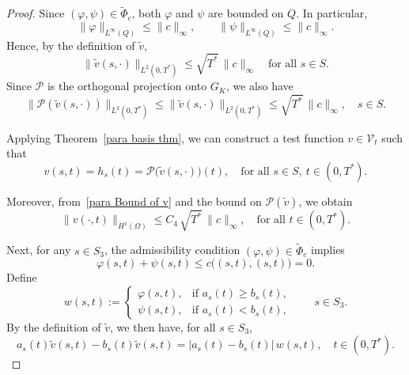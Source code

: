 \documentclass[12pt]{amsart}
\begin{document}
\begin{proof}

    Since \( (\varphi, \psi) \in \widetilde{\Phi}_c \), both \(\varphi\) and \(\psi\) are bounded on \(Q\). In particular,
    \begin{equation*}
        \|\varphi\|_{L^{\infty}(Q)} \leq \|c\|_{\infty}, 
        \qquad 
        \|\psi\|_{L^{\infty}(Q)} \leq \|c\|_{\infty}.
    \end{equation*}
    Hence, by the definition of \(\tilde{v}\),
    \begin{equation*}
        \|\tilde{v}(s, \cdot)\|_{L^2(0, T^*)} 
        \leq \sqrt{T^*}\,\|c\|_{\infty}
        \quad \text{for all } s \in S.
    \end{equation*}
    Since \(\mathcal{P}\) is the orthogonal projection onto \(G_K\), we also have
    \begin{equation*}
        \|\mathcal{P}(\tilde{v}(s, \cdot))\|_{L^2(0, T^*)} 
        \leq \|\tilde{v}(s, \cdot)\|_{L^2(0, T^*)} 
        \leq \sqrt{T^*}\,\|c\|_{\infty},
        \quad s \in S.
    \end{equation*}

    Applying Theorem~\ref{para basis thm}, we can construct a test function \( v \in \mathcal{V}_t \) such that
    \begin{equation}\label{eq:v-interpolation-S}
        v(s,t) = h_s(t) = \mathcal{P}\big(\tilde{v}(s,\cdot)\big)(t), 
        \quad \text{for all } s \in S,\ t\in(0,T^*).
    \end{equation}

    Moreover, from~\eqref{para Bound of v} and the bound on \(\mathcal{P}(\tilde{v})\), we obtain
    \begin{equation}\label{bound of v H1 para}
        \|v(\cdot,t)\|_{H^{1}(\Omega)}
        \leq C_4 \,\sqrt{T^*}\,\|c\|_{\infty},
        \quad \text{for all } t \in (0,T^*).
    \end{equation}

    Next, for any \(s \in S_3\), the admissibility condition \((\varphi,\psi)\in\widetilde{\Phi}_c\) implies
    \[
    \varphi(s, t) + \psi(s, t) \leq c\big((s, t), (s, t)\big) = 0.
    \]
    Define
    \[
    w(s, t) :=
    \begin{cases}
    \varphi(s, t), & \text{if } a_s(t) \geq b_s(t), \\[0.3em]
    \psi(s, t), & \text{if } a_s(t) < b_s(t),
    \end{cases}
    \qquad s \in S_3.
    \]
    By the definition of \(\tilde{v}\), we then have, for all \(s\in S_3\),
    \[
    a_s(t) \tilde{v}(s,t) - b_s(t) \tilde{v}(s,t) 
    = |a_s(t) - b_s(t)|\, w(s, t),
    \quad t\in(0,T^*).
    \]


\end{proof}
\end{document}

